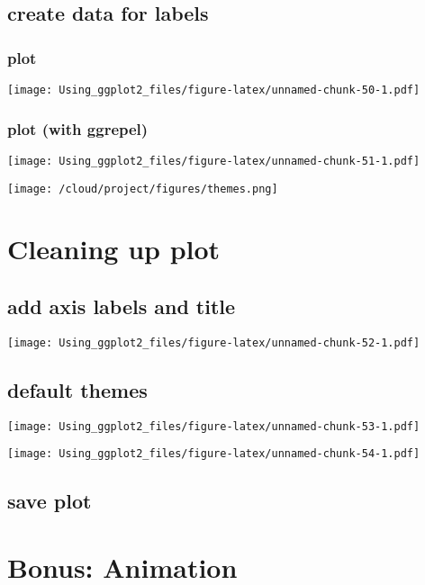\documentclass[]{article}
\begin{document}
\hypertarget{create-data-for-labels}{%
\subsection{create data for labels}\label{create-data-for-labels}}

\hypertarget{plot}{%
\subsubsection{plot}\label{plot}}

\texttt{[image: Using\_ggplot2\_files/figure-latex/unnamed-chunk-50-1.pdf]}

\hypertarget{plot-with-ggrepel}{%
\subsubsection{plot (with ggrepel)}\label{plot-with-ggrepel}}

\texttt{[image: Using\_ggplot2\_files/figure-latex/unnamed-chunk-51-1.pdf]}

\texttt{[image: /cloud/project/figures/themes.png]}

\hypertarget{cleaning-up-plot}{%
\section{Cleaning up plot}\label{cleaning-up-plot}}

\hypertarget{add-axis-labels-and-title}{%
\subsection{add axis labels and title}\label{add-axis-labels-and-title}}

\texttt{[image: Using\_ggplot2\_files/figure-latex/unnamed-chunk-52-1.pdf]}

\hypertarget{default-themes}{%
\subsection{default themes}\label{default-themes}}

\texttt{[image: Using\_ggplot2\_files/figure-latex/unnamed-chunk-53-1.pdf]}

\texttt{[image: Using\_ggplot2\_files/figure-latex/unnamed-chunk-54-1.pdf]}

\hypertarget{save-plot}{%
\subsection{save plot}\label{save-plot}}

\hypertarget{bonus-animation}{%
\section{Bonus: Animation}\label{bonus-animation}}
\end{document}
